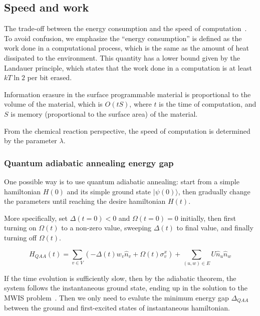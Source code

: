 \documentclass[twocolumn,superscriptaddress,english,showpacs,longbibliography]{revtex4-2}
\begin{document}
\subsection{Speed and work}\label{speed-and-work}

The trade-off between the energy consumption and the speed of
computation~\cite{Feynman2018}. To avoid confusion, we emphasize the
``energy consumption'' is defined as the work done in a computational
process, which is the same as the amount of heat dissipated to the
environment. This quantity has a lower bound given by the Landauer
principle, which states that the work done in a computation is at least
$kT\ln 2$ per bit erased\cite{Reeb2014}.

Information erasure in the surface programmable material is proportional
to the volume of the material, which is $O(tS)$, where $t$ is the
time of computation, and $S$ is memory (proportional to the surface
area) of the material.

From the chemical reaction perspective, the speed of computation is
determined by the parameter $\lambda$.

\subsubsection{Quantum adiabatic annealing energy gap}\label{quantum-adiabatic-annealing-energy-gap}

One possible way is to use quantum adiabatic annealing: start from a
simple hamiltonian $H(0)$ and its simple ground state
$|\psi(0)\rangle$, then gradually change the parameters until reaching
the desire hamiltonian $H(t)$.

More specifically, set $\Delta(t=0) <0$ and $\Omega(t=0) =0$
initially, then first turning on $\Omega(t)$ to a non-zero value,
sweeping $\Delta(t)$ to final value, and finally turning off
$\Omega(t)$.

\begin{equation}
H_{QAA}(t) = \sum_{v\in V} (-\Delta(t)w_v \hat n_v + \Omega(t)\sigma_{v}^x) + \sum_{(u,w) \in E} U\hat n_u \hat n_w
\end{equation}

If the time evolution is sufficiently slow, then by the adiabatic
theorem, the system follows the instantaneous ground state, ending up in
the solution to the MWIS problem~\cite{Pichler2018}.
Then we only need to evalute
the minimum energy gap $\Delta_{QAA}$ between the ground and
first-excited states of instantaneous hamiltonian.
\end{document}
